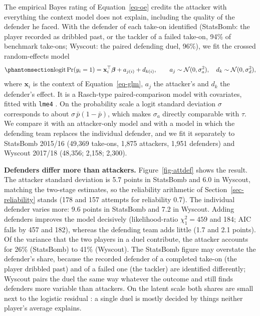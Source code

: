 \documentclass[
  12pt]{article}
\begin{document}
The empirical Bayes rating of Equation~\ref{eq-oe} credits the attacker
with everything the context model does not explain, including the
quality of the defender he faced. With the defender of each take-on
identified (StatsBomb: the player recorded as dribbled past, or the
tackler of a failed take-on, 94\% of benchmark take-ons; Wyscout: the
paired defending duel, 96\%), we fit the crossed random-effects model
\begin{equation}\protect\phantomsection\label{eq-glmm}{\operatorname{logit}\Pr(y_i=1) = \mathbf{x}_i^\top\boldsymbol\beta + a_{j(i)} + d_{k(i)},\qquad a_j\sim\mathcal N(0,\sigma_a^2),\quad d_k\sim\mathcal N(0,\sigma_d^2),}\end{equation}
where \(\mathbf{x}_i\) is the context of Equation~\ref{eq-glm}, \(a_j\)
the attacker's and \(d_k\) the defender's effect. It is a Rasch-type
paired-comparison model \citep{rasch1960} with covariates, fitted with
\texttt{lme4} \citep{bates2015}. On the probability scale a logit
standard deviation \(\sigma\) corresponds to about
\(\sigma\,\bar p(1-\bar p)\), which makes \(\sigma_a\) directly
comparable with \(\hat\tau\). We compare it with an attacker-only model
and with a model in which the defending team replaces the individual
defender, and we fit it separately to StatsBomb 2015/16 (49,369
take-ons, 1,875 attackers, 1,951 defenders) and Wyscout 2017/18 (48,356;
2,158; 2,300).

\textbf{Defenders differ more than attackers.} Figure~\ref{fig-attdef}
shows the result. The attacker standard deviation is 5.7 points in
StatsBomb and 6.0 in Wyscout, matching the two-stage estimates, so the
reliability arithmetic of Section~\ref{sec-reliability} stands (178 and
157 attempts for reliability 0.7). The individual defender varies more:
9.6 points in StatsBomb and 7.2 in Wyscout. Adding defenders improves
the model decisively (likelihood-ratio \(\chi^2_1=459\) and 184; AIC
falls by 457 and 182), whereas the defending team adds little (1.7 and
2.1 points). Of the variance that the two players in a duel contribute,
the attacker accounts for 26\% (StatsBomb) to 41\% (Wyscout). The
StatsBomb figure may overstate the defender's share, because the
recorded defender of a completed take-on (the player dribbled past) and
of a failed one (the tackler) are identified differently; Wyscout pairs
the duel the same way whatever the outcome and still finds defenders
more variable than attackers. On the latent scale both shares are small
next to the logistic residual \citep{nakagawa2013}: a single duel is
mostly decided by things neither player's average explains.
\end{document}
